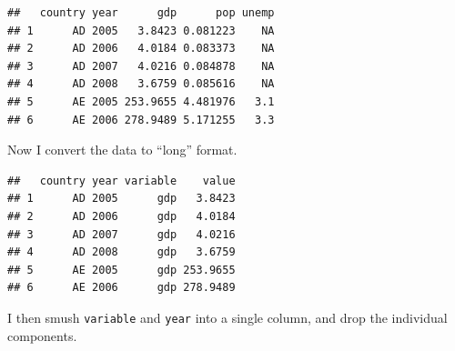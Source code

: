 \documentclass[12pt,oneside,openany]{tufte-book}
\newenvironment{Shaded}{}{}
\newcommand{\KeywordTok}[1]{\textcolor[rgb]{0.00,0.44,0.13}{\textbf{{#1}}}}
\newcommand{\DataTypeTok}[1]{\textcolor[rgb]{0.56,0.13,0.00}{{#1}}}
\newcommand{\FloatTok}[1]{\textcolor[rgb]{0.25,0.63,0.44}{{#1}}}
\newcommand{\StringTok}[1]{\textcolor[rgb]{0.25,0.44,0.63}{{#1}}}
\newcommand{\NormalTok}[1]{{#1}}
\begin{document}
\begin{Shaded}
\end{Shaded}

\begin{verbatim}
##   country year      gdp      pop unemp
## 1      AD 2005   3.8423 0.081223    NA
## 2      AD 2006   4.0184 0.083373    NA
## 3      AD 2007   4.0216 0.084878    NA
## 4      AD 2008   3.6759 0.085616    NA
## 5      AE 2005 253.9655 4.481976   3.1
## 6      AE 2006 278.9489 5.171255   3.3
\end{verbatim}

Now I convert the data to ``long'' format.

\begin{Shaded}
\end{Shaded}

\begin{verbatim}
##   country year variable    value
## 1      AD 2005      gdp   3.8423
## 2      AD 2006      gdp   4.0184
## 3      AD 2007      gdp   4.0216
## 4      AD 2008      gdp   3.6759
## 5      AE 2005      gdp 253.9655
## 6      AE 2006      gdp 278.9489
\end{verbatim}

I then smush \texttt{variable} and \texttt{year} into a single column,
and drop the individual components.
\end{document}

